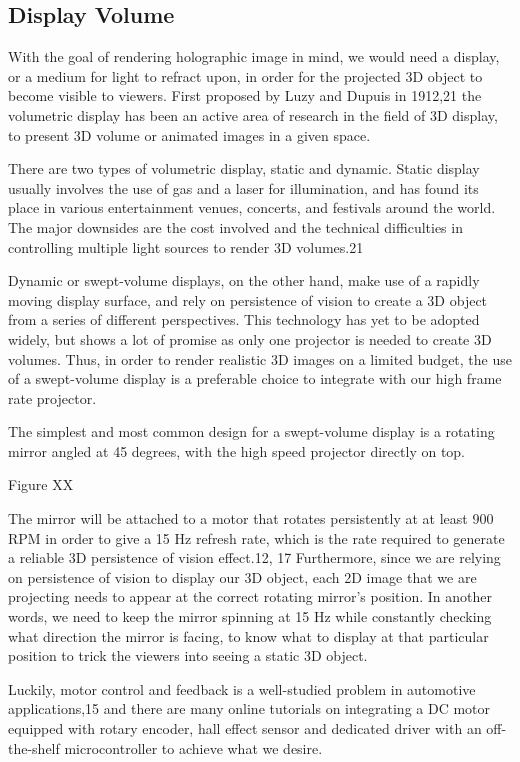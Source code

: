 \documentclass[12pt]{article}
\begin{document}
\subsection{Display Volume}
With the goal of rendering holographic image in mind, we would need a display, or a medium for light to refract upon, in order for the projected 3D object to become visible to viewers. First proposed by Luzy and Dupuis in 1912,21 the volumetric display has been an active area of research in the field of 3D display, to present 3D volume or animated images in a given space. 

There are two types of volumetric display, static and dynamic. Static display usually involves the use of gas and a laser for illumination, and has found its place in various entertainment venues, concerts, and festivals around the world. The major downsides are the cost involved and the technical difficulties in controlling multiple light sources to render 3D volumes.21

Dynamic or swept-volume displays, on the other hand, make use of a rapidly moving display surface, and rely on persistence of vision to create a 3D object from a series of different perspectives. This technology has yet to be adopted widely, but shows a lot of promise as only one projector is needed to create 3D volumes. Thus, in order to render realistic 3D images on a limited budget, the use of a swept-volume display is a preferable choice to integrate with our high frame rate projector.

The simplest and most common design for a swept-volume display is a rotating mirror angled at 45 degrees, with the high speed projector directly on top.

Figure XX

The mirror will be attached to a motor that rotates persistently at at least 900 RPM in order to give a 15 Hz refresh rate, which is the rate required to generate a reliable 3D persistence of vision effect.12, 17 Furthermore, since we are relying on persistence of vision to display our 3D object, each 2D image that we are projecting needs to appear at the correct rotating mirror’s position. In another words, we need to keep the mirror spinning at 15 Hz while constantly checking what direction the mirror is facing, to know what to display at that particular position to trick the viewers into seeing a static 3D object. 

Luckily, motor control and feedback is a well-studied problem in automotive applications,15 and there are many online tutorials on integrating a DC motor equipped with rotary encoder, hall effect sensor and dedicated driver with an off-the-shelf microcontroller to achieve what we desire. 
\end{document}
